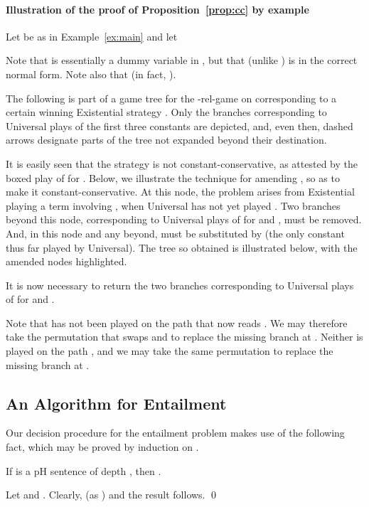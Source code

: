 \documentclass{LMCS}
\begin{document}
\paragraph{Illustration of the proof of Proposition~\ref{prop:cc}  by example}
Let  be as in Example~\ref{ex:main} and let  

Note that  is essentially a dummy variable in , but that  (unlike ) is in the correct normal form. Note also that  (in fact, ).

The following is part of a game tree  for the -rel-game on  corresponding to a certain winning Existential strategy . Only the branches corresponding to Universal plays of the first three constants  are depicted, and, even then, dashed arrows designate parts of the tree not expanded beyond their destination.



 \medskip

It is easily seen that the strategy  is not constant-conservative, as attested by the boxed play of  for . Below, we illustrate the technique for amending , so as to make it constant-conservative. At this node, the problem arises from Existential playing a term involving , when Universal has not yet played . Two branches beyond this node, corresponding to Universal plays of  for  and , must be removed. And, in this node and any beyond,  must be substituted by  (the only constant thus far played by Universal). The tree so obtained is illustrated below, with the amended nodes highlighted.

 \medskip

\noindent It is now necessary to return the two branches corresponding to Universal plays of  for  and .


 \medskip

\noindent Note that  has not been played on the path that now reads . We may therefore take the permutation that swaps  and  to replace the missing branch at . Neither is  played on the path , and we may take the same permutation to replace the missing branch at .


\subsection{An Algorithm for Entailment}
\label{LHS:sec:alg}

Our decision procedure for the entailment problem makes use of the following fact, which may be proved by induction on .
\begin{fact}
\label{fact2}
If  is a pH sentence of depth , then .
\end{fact}
\proof
Let  and . Clearly,  (as ) and the result follows.
\qed
\end{document}
